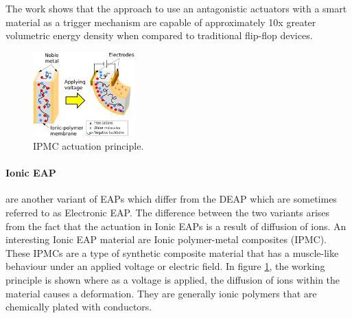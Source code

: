 The work shows that the approach to use an antagonistic actuators with a smart material as a trigger mechanism are capable of approximately 10x greater volumetric energy density when compared to traditional flip-flop devices.

\begin{figure}
	\centering
	\vspace{-20pt}
	\includegraphics[width=0.35\textwidth]{Figures/IPMC_fig.eps}
	\caption{IPMC actuation principle\cite{poubel_proposal_2011}.}
	\vspace{-15pt}
	\label{fig:IPMC_act}
\end{figure}
\paragraph{Ionic EAP} are another variant of EAPs which differ from the DEAP which are sometimes referred to as Electronic EAP\cite{bar-cohen_artificial_2005}. The difference between the two variants arises from the fact that the actuation in Ionic EAPs is a result of diffusion of ions. An interesting Ionic EAP material are Ionic polymer-metal composites (IPMC). These IPMCs are a type of synthetic composite material that has a muscle-like behaviour under an applied voltage or electric field. In figure \ref{fig:IPMC_act}, the working principle is shown where as a voltage is applied, the diffusion of ions within the material causes a deformation. They are generally ionic polymers that are chemically plated with conductors\cite{shahinpoor_ionic_1998}.

